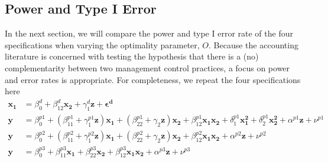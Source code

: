 \documentclass[12pt]{article}
\begin{document}
\subsection{Power and Type I Error}
In the next section, we will compare the power and type I error rate of the four specifications when varying the optimality parameter, $O$. Because the accounting literature is concerned with testing the hypothesis that there is a (no) complementarity between two management control practices, a focus on power and error rates is appropriate. For completeness, we repeat the four specifications here
\begin{align*} 
\mathbf{x_1} &= \beta_0^d + \beta_{12}^d \mathbf{x_2} 
        + \gamma_{1}^d \mathbf{z}
        + \mathbf{\epsilon^d} \\
\mathbf{y} &=  \beta^{p1}_0 + (\beta^{p1}_{11} + \gamma_1^{p1} \mathbf{z} )\mathbf{x_1} 
						+ (\beta_{22}^{p1} + \gamma_2 \mathbf{z} ) \mathbf{x_2} 
                        + \beta_{12}^{p1} \mathbf{x_1} \mathbf{x_2} 
                        + \delta_1^{p1} \mathbf{x^2_1} + \delta_2^{p1} \mathbf{x^2_2} 
                        + \alpha^{p1} \mathbf{z}
                        + \nu^{p1} \\
 \mathbf{y} &=  \beta^{p2}_0 + (\beta^{p2}_{11} + \gamma_1^{p2} \mathbf{z} )\mathbf{x_1} 
						+ (\beta_{22}^{p2} + \gamma_2 \mathbf{z} ) \mathbf{x_2} 
                        + \beta_{12}^{p2} \mathbf{x_1} \mathbf{x_2} 
                        + \alpha^{p2} \mathbf{z}
                        + \nu^{p2} \\
 \mathbf{y} &=  \beta^{p3}_0 + \beta^{p3}_{11} \mathbf{x_1} 
						+ \beta_{22}^{p3} \mathbf{x_2} 
                        + \beta_{12}^{p3} \mathbf{x_1} \mathbf{x_2} 
                        + \alpha^{p3} \mathbf{z}
                        + \nu^{p3}
\end{align*}
\end{document}
